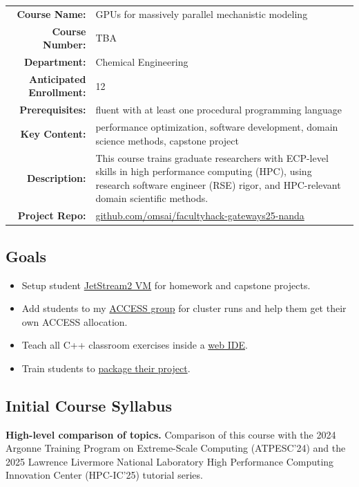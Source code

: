 \documentclass{article}
\renewcommand{\small}{\fontsize{20.74}{25}\selectfont}
\newcommand{\sectionbox}[1]{%
  \begin{tcolorbox}[sharp corners,boxrule=0pt,colback=fh-blue,coltext=fh-gold]%
    \section*{#1\vphantom{Yy}}%
  \end{tcolorbox}%
}
\begin{document}
\begin{multicols}{2}
  {
    \begin{tabularx}{\linewidth}{>{\bfseries}r X}
      \toprule
      Course Name:
      & GPUs for massively parallel mechanistic modeling\\
      Course Number:
      & TBA\\
      Department:
      & Chemical Engineering\\
      Anticipated Enrollment:
      & 12\\
      Prerequisites:
      & fluent with at least one %
      procedural programming language\\
      Key Content:
      & performance optimization, %
      software development, %
      domain science methods, %
      capstone project\\
      Description:
      & This course trains graduate researchers %
      with ECP-level skills in high performance computing (HPC), %
      using research software engineer (RSE) rigor, %
      and HPC-relevant domain scientific methods.\\
      Project Repo:
      & \small \url{github.com/omsai/facultyhack-gateways25-nanda}\\
      \bottomrule
    \end{tabularx}
    \medskip
  }

  \subsection*{\textcolor{fh-blue}{Goals}}
  \begin{itemize}
  \item Setup student \ul{JetStream2 VM} for homework and capstone projects.
  \item Add students to my \ul{ACCESS group} for cluster runs and %
    help them get their own ACCESS allocation.
  \item Teach all C++ classroom exercises inside a \ul{web IDE}. 
  \item Train students to \ul{package their project}.
  \end{itemize}

  \sectionbox{Initial Course Syllabus}%
  \noindent
    \textbf{High-level comparison of topics.}
        Comparison of this course with the %
        2024 Argonne Training Program on Extreme-Scale Computing (ATPESC'24) %
        and the 2025 Lawrence Livermore National Laboratory %
        High Performance Computing Innovation Center (HPC-IC'25) %
        tutorial series.
        \medskip


\end{multicols}
\end{document}
